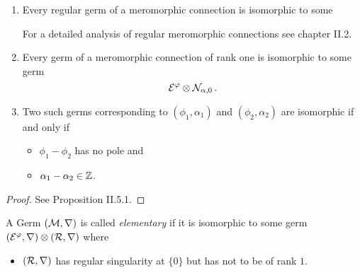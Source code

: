 \begin{prop}
  \begin{enumerate}
    \item Every regular germ of a meromorphic connection is isomorphic to some
      \TODO{}
      \begin{rem}
        For a detailed analysis of regular meromorphic connections see
        \cite{sabbah2007isomonodromic} chapter II.2.
      \end{rem}
    \item Every germ of a meromorphic connection of rank one is isomorphic to
      some germ
      \[
        \mathcal{E}^\varphi\otimes\mathcal{N}_{\alpha,0} \,.
      \]
    \item Two such germs corresponding to $(\phi_1,\alpha_1)$ and
      $(\phi_2,\alpha_2)$ are isomorphic if and only if
      \begin{itemize}
        \item $\phi_1-\phi_2$ has no pole and
        \item $\alpha_1-\alpha_2\in\mathbb{Z}$.
      \end{itemize}
  \end{enumerate}
\end{prop}
\begin{proof}
  See \cite{sabbah2007isomonodromic} Proposition II.5.1.
\end{proof}
\begin{defn}
  A Germ $(\mathcal{M},\nabla)$ is called \emph{elementary} if it is isomorphic to
  some germ $(\mathcal{E}^\varphi,\nabla)\otimes(\mathcal{R},\nabla)$ where
  \begin{itemize}
    \item $(\mathcal{R},\nabla)$ has regular singularity at $\{0\}$ but has not to be
      of rank $1$.
  \end{itemize}
\end{defn}
